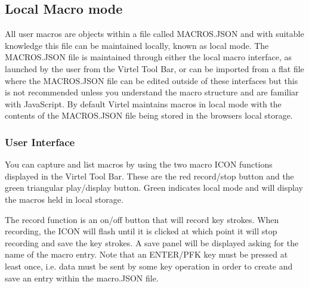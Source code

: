\documentclass[letterpaper,10pt,english]{sphinxmanual}
\begin{document}
\subsection{Local Macro mode}
\label{\detokenize{Customization:local-macro-mode}}
All user macros are objects within a file called MACROS.JSON and with suitable knowledge this file can be maintained locally, known as local mode. The MACROS.JSON file is maintained through either the local macro interface, as launched by the user from the Virtel Tool Bar, or can be imported from a flat file where the MACROS.JSON file can be edited outside of these interfaces but this is not recommended unless you understand the macro structure and are familiar with JavaScript. By default Virtel maintains macros in local mode with the contents of the MACROS.JSON file being stored in the browsers local storage.


\subsubsection{User Interface}
\label{\detokenize{Customization:user-interface}}
\ignorespaces 
{}

You can capture and list macros by using the two macro ICON functions displayed in the Virtel Tool Bar. These are the red record/stop button and the green triangular play/display button. Green indicates local mode and will display the macros held in local storage.



The record function is an on/off button that will record key strokes. When recording, the ICON will flash until it is clicked at which point it will stop recording and save the key strokes. A save panel will be displayed asking for the name of the macro entry. Note that an ENTER/PFK key must be pressed at least once, i.e. data must be sent by some key operation in order to create and save an entry within the macro.JSON file.



\ignorespaces 
{}
\end{document}
